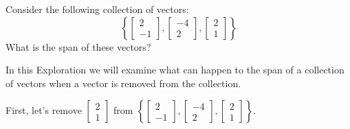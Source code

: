 \documentclass{ximera}
\begin{document}
\begin{exploration}\label{exp:redundantVecs1}
Consider the following collection of vectors:
$$\left\{\begin{bmatrix}2\\-1\end{bmatrix}, \begin{bmatrix}-4\\2\end{bmatrix}, \begin{bmatrix}2\\1\end{bmatrix}\right\}$$
What is the span of these vectors?  

In this Exploration we will examine what can happen to the span of a collection of vectors when a vector is removed from the collection.  

First, let's remove
$\begin{bmatrix}2\\1\end{bmatrix}$ from $\left\{\begin{bmatrix}2\\-1\end{bmatrix}, \begin{bmatrix}-4\\2\end{bmatrix}, \begin{bmatrix}2\\1\end{bmatrix}\right\}$.  


\end{exploration}
\end{document}
